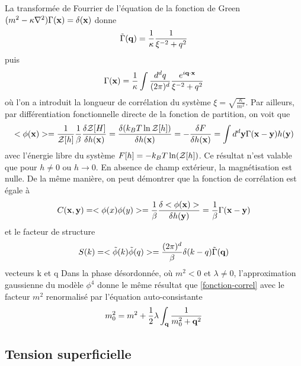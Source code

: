 La transformée de Fourrier de l'équation de la fonction de Green $(m^2-\kappa \nabla^2) \Gamma({\bf x}) = \delta({\bf x})$ donne
\begin{align}
    \tilde{\Gamma}({\bf q}) = \frac{1}{\kappa} \frac{1}{\xi^{-2} +  q^2}
\end{align}
puis
\begin{align}
    \Gamma({\bf x}) = \frac{1}{\kappa} \int \frac{d^dq}{(2\pi)^d} \frac{e^{i {\bf q} \cdot {\bf x}}}{\xi^{-2} +  q^2}
    \label{fonction-correl}
\end{align}
où l'on a introduit la longueur de corrélation du système $\xi = \sqrt{\frac{\kappa}{m^2}}$.
Par ailleurs, par différentiation fonctionnelle directe de la fonction de partition, on voit que
\begin{align}
    <\phi({\bf x})> = \frac{1}{\mathcal{Z}[h]} \frac{1}{\beta} \frac{\delta \mathcal{Z}[H]}{\delta h({\bf x})} = \frac{\delta (k_B T \ln \mathcal{Z}[h])}{\delta h({\bf x})} = - \frac{\delta F}{\delta h({\bf x})} = \int d^d {\bf y} \Gamma({\bf x}-{\bf y}) h({\bf y})
\end{align} 
avec l'énergie libre du système  $F[h] = -k_B T \ln(\mathcal{Z}[h])$. Ce résultat n'est valable que pour $h \neq 0$ ou $h \to 0$. En absence de champ extérieur, la magnétisation est nulle.
De la même manière, on peut démontrer que la fonction de corrélation est égale à 
\begin{align}
    C({\bf x},{\bf y}) =  <\phi(x)\phi(y)> = \frac{1}{\beta} \frac{\delta <\phi({\bf x})>}{\delta h({\bf y})} = \frac{1}{\beta} \Gamma({\bf x}-{\bf y})
\end{align}
et le facteur de structure
\begin{align}
    S(k) = < \tilde{\phi}(k)\tilde{\phi}(q)> = \frac{(2\pi)^d}{\beta} \delta(k-q)  \tilde{\Gamma}({\bf q})
\end{align}
{\color{red} vecteurs k et q}
Dans la phase désordonnée, où $m^2 \less 0$ et $\lambda \neq 0$, l'approximation gaussienne du modèle $\phi^4$ donne le même résultat que \ref{fonction-correl} avec le facteur $m^2$ renormalisé par l'équation auto-consistante \cite[\P 4.3]{bellac_equilibrium_2004}
\begin{align}
    m^2_0 = m^2 + \frac{1}{2} \lambda \int_{\bf q} \frac{1}{m^2_0+{\bf q}^2}
\end{align}
    \subsection{Tension superficielle}


